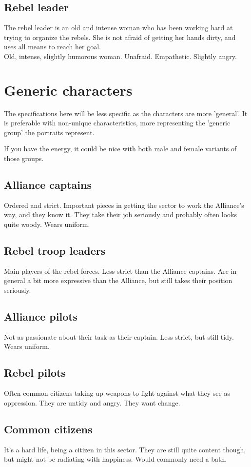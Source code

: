 \documentclass[a4paper,12pt]{article}
\begin{document}
\subsection{Rebel leader}

The rebel leader is an old and intense woman who has been working hard at trying to organize the
rebels. She is not afraid of getting her hands dirty, and uses all means to reach her goal.\\

Old, intense, slightly humorous woman. Unafraid. Empathetic. Slightly angry.

\section{Generic characters}

The specifications here will be less specific as the characters are more 'general'. It is preferable
with non-unique characteristics, more representing the 'generic group' the portraits represent.

If you have the energy, it could be nice with both male and female variants of those groups.

\subsection{Alliance captains}

Ordered and strict. Important pieces in getting the sector to work the Alliance's way, and they know it.
They take their job seriously and probably often looks quite woody. Wears uniform.

\subsection{Rebel troop leaders}

Main players of the rebel forces. Less strict than the Alliance captains. 
Are in general a bit more expressive than the Alliance, but still takes their position seriously.

\subsection{Alliance pilots}

Not as passionate about their task as their captain. Less strict, but still tidy. Wears uniform.

\subsection{Rebel pilots}

Often common citizens taking up weapons to fight against what they see as oppression.
They are untidy and angry. They want change.

\subsection{Common citizens}

It's a hard life, being a citizen in this sector. They are still quite content though, but might not
be radiating with happiness. Would commonly need a bath.
\end{document}
